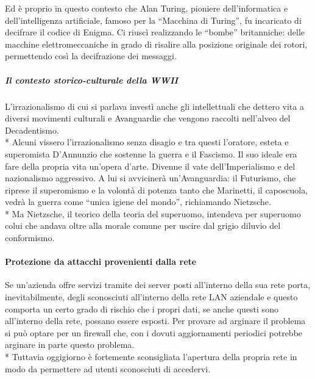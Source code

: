 \documentclass[12pt]{article}
\begin{document}
Ed è proprio in questo contesto che Alan Turing, pioniere dell’informatica e dell’intelligenza artificiale, famoso per la “Macchina di Turing”, fu incaricato di decifrare il codice di Enigma. Ci riuscì realizzando le “bombe” britanniche: delle macchine elettromeccaniche in grado di risalire alla posizione originale dei rotori, permettendo così la decifrazione dei messaggi.

\bigskip
\subparagraph{Il contesto storico-culturale della WWII}
L’irrazionalismo di cui si parlava investì anche gli intellettuali che dettero vita a diversi movimenti culturali e Avanguardie che vengono raccolti nell’alveo del Decadentismo.\\* Alcuni vissero l'irrazionalismo senza disagio e tra questi l’oratore, esteta e superomista D’Annunzio che sostenne la guerra e il Fascismo. Il suo ideale era fare della propria vita un’opera d’arte. Divenne il vate dell’Imperialismo e del nazionalismo aggressivo. A lui si avvicinerà un'Avanguardia: il Futurismo, che riprese il superomismo e la volontà di potenza tanto che Marinetti, il caposcuola, vedrà la guerra come “unica igiene del mondo”, richiamando Nietzsche. \\*
Ma Nietzsche, il teorico della teoria del superuomo, intendeva per superuomo colui che andava oltre alla morale comune per uscire dal grigio diluvio del conformismo.

\bigskip
\paragraph{Protezione da attacchi provenienti dalla rete}
Se un’azienda offre servizi tramite dei server posti all’interno della sua rete porta, inevitabilmente, degli sconosciuti all’interno della rete LAN aziendale e questo comporta un certo grado di rischio che i propri dati, se anche questi sono all’interno della rete, possano essere esposti.
Per provare ad arginare il problema si può optare per un firewall che, con i dovuti aggiornamenti periodici potrebbe arginare in parte questo problema.\\*
Tuttavia oggigiorno è fortemente sconsigliata l’apertura della propria rete in modo da permettere ad utenti sconosciuti di accedervi. 
\end{document}
